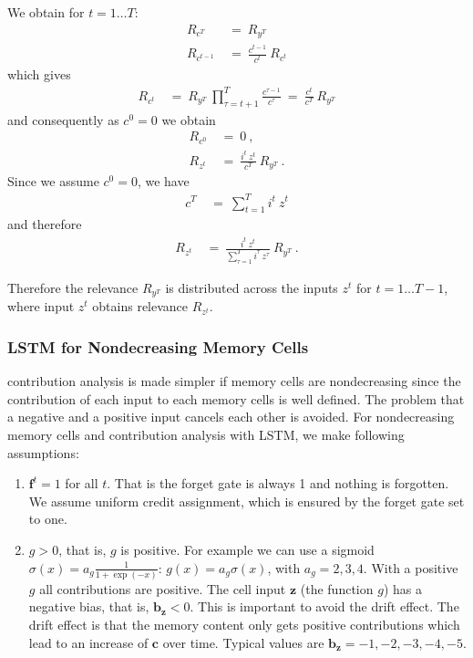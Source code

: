 \documentclass{article}
\newcommand\Bb{\bm{b}}
\newcommand\Bc{\bm{c}}
\newcommand\Bf{\bm{f}}
\newcommand\Bz{\bm{z}}
\begin{document}
\begin{appendices}
We obtain for $t=1 \ldots T$:
\begin{align}
    R_{c^T}\ &= \   R_{y^T} \\
    R_{c^{t-1}}\ &= \  \frac{c^{t-1}}{c^t} \ R_{c^t} 
\end{align}
which gives
\begin{align}
    R_{c^t}\ &= \   R_{y^T} \ \prod_{\tau=t+1}^{T}
               \frac{c^{\tau-1}}{c^{\tau}}
  \ = \ \frac{c^{t}}{c^{T}} \ R_{y^T} 
\end{align}
and consequently as $c^0=0$ we obtain
\begin{align}
   R_{c^0}\ &= \ 0 \ , \\ 
    R_{z^t}\ &= \   \frac{i^t \ z^t }{c^{T}} \ R_{y^T} \ . 
\end{align}
Since we assume $c^0=0$, we have
\begin{align}
   c^{T}\ &= \   \sum_{t=1}^{T} i^t \ z^t 
\end{align}
and therefore
\begin{align}
    R_{z^t}\ &= \   \frac{i^t \ z^t }{\sum_{\tau=1}^{T} i^{\tau} \ z^{\tau}} \ R_{y^T} \ . 
\end{align}

Therefore the relevance $R_{y^T}$ is distributed across the inputs
$z^t$ for $t=1 \ldots T-1$, where input $z^t$ obtains relevance $R_{z^t}$.


\subsubsection{LSTM for Nondecreasing Memory Cells}

contribution analysis is made simpler if memory cells are nondecreasing since
the contribution of each input to each memory cells
is well defined. The problem that a 
negative and a positive input cancels each other is avoided. 
For nondecreasing memory cells 
and contribution analysis with LSTM, 
we make following assumptions:
\begin{enumerate}[label=\textbf{(A\arabic*)}]
\item $\Bf^t=1$ for all $t$. That is the forget gate is always 1 and
  nothing is forgotten. We assume uniform credit assignment, which
  is ensured by the forget gate set to one.

\item $g>0$, that is, $g$ is positive. For example we can use a sigmoid
  $\sigma(x)= a_g \frac{1}{1+\exp(-x)}$: $g(x)=a_g \sigma(x)$, with
  $a_g = 2,3,4$.
  With a positive $g$ all
  contributions are positive.
  The cell input $\Bz$ (the function $g$) has a negative bias, that is,
  $\Bb_{\Bz}<0$. This is important to avoid the drift effect.
  The drift effect is that the memory content only gets positive
  contributions which lead to an increase of $\Bc$ over time.
  Typical values are $\Bb_{\Bz} = -1,-2,-3,-4,-5$.


\end{enumerate}
\end{appendices}
\end{document}
